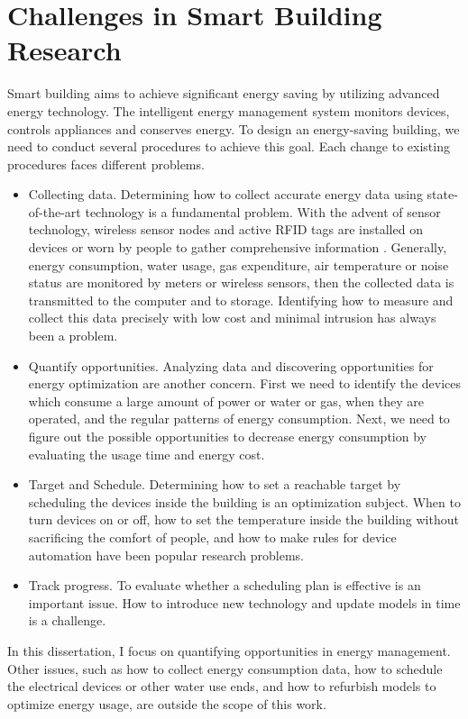 \section{Challenges in Smart Building Research}
Smart building aims to achieve significant energy saving by utilizing advanced energy technology. 
The intelligent energy management system monitors devices, controls appliances and conserves energy. To design an energy-saving building, we need to conduct several procedures to achieve this goal. Each change to existing procedures faces different problems. 
\begin{itemize}
  \item Collecting data. 
Determining how to collect accurate energy data using state-of-the-art technology is a fundamental problem. 
  With the advent of sensor technology, wireless sensor nodes and active RFID tags are 
  installed on devices or worn by people to gather comprehensive information \cite{vullers2010energy}. 
Generally, energy consumption, water usage, gas expenditure, air temperature or noise status are monitored by meters or wireless sensors, then the collected data is transmitted to the computer and to storage. 
Identifying how to measure and collect this data precisely with low cost and minimal intrusion has always been a problem. 
  \item Quantify opportunities.
 Analyzing data and discovering opportunities for energy optimization are another concern. 
First we need to identify the devices which consume a large amount of power or water or gas, when they are operated, and the regular patterns of energy consumption. Next, we need to figure out the possible opportunities to decrease energy consumption by evaluating the usage time and energy cost. 
\item Target and Schedule. 
Determining how to set  a reachable target by scheduling the devices inside the building is an optimization subject. When to turn devices on or off, how to set the temperature inside the building without sacrificing the comfort of people, and how to make rules for device automation have been popular research problems. 
\item Track progress.
To evaluate whether a scheduling plan is effective is an important issue. 
How to introduce new technology and update models in time is a challenge. 
\end{itemize} 

In this dissertation, I focus on quantifying opportunities in energy management. Other issues, such as how to collect energy consumption data, how to schedule the electrical devices or other water use ends, and how to refurbish models to optimize energy usage, are outside the scope of this work. 

